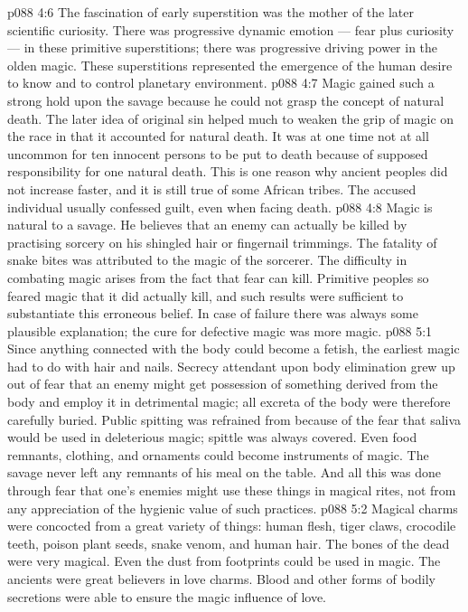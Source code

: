 \vs p088 4:6 The fascination of early superstition was the mother of the later scientific curiosity. There was progressive dynamic emotion --- fear plus curiosity --- in these primitive superstitions; there was progressive driving power in the olden magic. These superstitions represented the emergence of the human desire to know and to control planetary environment.
\vs p088 4:7 Magic gained such a strong hold upon the savage because he could not grasp the concept of natural death. The later idea of original sin helped much to weaken the grip of magic on the race in that it accounted for natural death. It was at one time not at all uncommon for ten innocent persons to be put to death because of supposed responsibility for one natural death. This is one reason why ancient peoples did not increase faster, and it is still true of some African tribes. The accused individual usually confessed guilt, even when facing death.
\vs p088 4:8 Magic is natural to a savage. He believes that an enemy can actually be killed by practising sorcery on his shingled hair or fingernail trimmings. The fatality of snake bites was attributed to the magic of the sorcerer. The difficulty in combating magic arises from the fact that fear can kill. Primitive peoples so feared magic that it did actually kill, and such results were sufficient to substantiate this erroneous belief. In case of failure there was always some plausible explanation; the cure for defective magic was more magic.
\vs p088 5:1 Since anything connected with the body could become a fetish, the earliest magic had to do with hair and nails. Secrecy attendant upon body elimination grew up out of fear that an enemy might get possession of something derived from the body and employ it in detrimental magic; all excreta of the body were therefore carefully buried. Public spitting was refrained from because of the fear that saliva would be used in deleterious magic; spittle was always covered. Even food remnants, clothing, and ornaments could become instruments of magic. The savage never left any remnants of his meal on the table. And all this was done through fear that one’s enemies might use these things in magical rites, not from any appreciation of the hygienic value of such practices.
\vs p088 5:2 Magical charms were concocted from a great variety of things: human flesh, tiger claws, crocodile teeth, poison plant seeds, snake venom, and human hair. The bones of the dead were very magical. Even the dust from footprints could be used in magic. The ancients were great believers in love charms. Blood and other forms of bodily secretions were able to ensure the magic influence of love.
